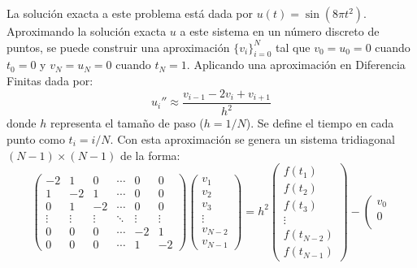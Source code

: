 \documentclass[12pt]{article}
\begin{document}
\begin{enumerate}
La soluci\'on exacta a este problema est\'a dada por $u(t) = \sin(8\pi t^2)$. Aproximando la 
soluci\'on exacta $u$ a este sistema en un n\'umero discreto de puntos, se puede construir una 
aproximaci\'on $\{v_i\}_{i=0}^N$ tal que $v_0=u_0=0$ cuando $t_0=0$ y $v_N=u_N=0$ cuando $t_N=1$. 
Aplicando una aproximaci\'on en Diferencia Finitas dada por:
$$
u_i'' \approx \dfrac{v_{i-1}-2v_i+v_{i+1}}{h^2}
$$
donde $h$ representa el tama\~no de paso ($h=1/N$). Se define el tiempo en cada punto como $t_i = 
i/N$. Con esta aproximaci\'on se genera un sistema tridiagonal $(N-1)\times(N-1)$ de la forma:
$$
\left(\begin{array}{cccccc}
         -2 & 1 & 0 & \cdots & 0 & 0\\
         1 & -2 & 1 & \cdots & 0 & 0\\
         0 & 1 & -2 & \cdots & 0 & 0\\
         \vdots & \vdots & \vdots & \ddots & \vdots& \vdots \\
         0 & 0 & 0 & \cdots & -2 & 1\\
         0 & 0 & 0 & \cdots & 1 & -2
      \end{array}\right)\left(\begin{array}{c}
                                 v_1\\
                                 v_2\\
                                 v_3\\
                                 \vdots\\
                                 v_{N-2}\\
                                 v_{N-1}
                              \end{array}\right) = h^2\left(\begin{array}{c}
                                 f(t_1)\\
                                 f(t_2)\\
                                 f(t_3)\\
                                 \vdots\\
                                 f(t_{N-2})\\
                                 f(t_{N-1})
                              \end{array}\right)-\left(\begin{array}{c}
                                 v_0\\
                                 0\\

\end{array}$$
\end{enumerate}
\end{document}
